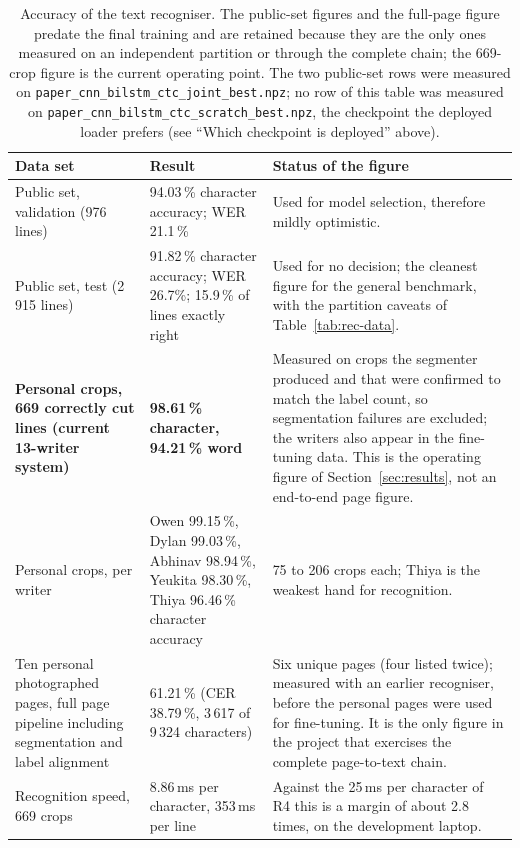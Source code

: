 \begin{table}[h]
\centering
\fontsize{9.5}{11.5}\selectfont
\begin{tabularx}{\linewidth}{|p{3.7cm}|p{2.7cm}|X|}
\hline
\textbf{Data set} & \textbf{Result} & \textbf{Status of the figure} \\
\hline
Public set, validation (976 lines) & 94.03\,\% character accuracy; WER 21.1\,\% & Used for model selection, therefore mildly optimistic. \\
\hline
Public set, test (2\,915 lines) & 91.82\,\% character accuracy; WER 26.7\%; 15.9\,\% of lines exactly right & Used for no decision; the cleanest figure for the general benchmark, with the partition caveats of Table~\ref{tab:rec-data}. \\
\hline
\textbf{Personal crops, 669 correctly cut lines (current 13-writer system)} & \textbf{98.61\,\% character, 94.21\,\% word} & Measured on crops the segmenter produced and that were confirmed to match the label count, so segmentation failures are excluded; the writers also appear in the fine-tuning data. This is the operating figure of Section~\ref{sec:results}, not an end-to-end page figure. \\
\hline
Personal crops, per writer & Owen 99.15\,\%, Dylan 99.03\,\%, Abhinav 98.94\,\%, Yeukita 98.30\,\%, Thiya 96.46\,\% character accuracy & 75 to 206 crops each; Thiya is the weakest hand for recognition. \\
\hline
Ten personal photographed pages, full page pipeline including segmentation and label alignment & 61.21\,\% (CER 38.79\,\%, 3\,617 of 9\,324 characters) & Six unique pages (four listed twice); measured with an earlier recogniser, before the personal pages were used for fine-tuning. It is the only figure in the project that exercises the complete page-to-text chain. \\
\hline
Recognition speed, 669 crops & 8.86\,ms per character, 353\,ms per line & Against the 25\,ms per character of R4 this is a margin of about 2.8 times, on the development laptop. \\
\hline
\end{tabularx}
\caption{Accuracy of the text recogniser. The public-set figures and the full-page figure predate the final training and are retained because they are the only ones measured on an independent partition or through the complete chain; the 669-crop figure is the current operating point. The two public-set rows were measured on \texttt{paper\_cnn\_bilstm\_ctc\_joint\_best.npz}; no row of this table was measured on \texttt{paper\_cnn\_bilstm\_ctc\_scratch\_best.npz}, the checkpoint the deployed loader prefers (see ``Which checkpoint is deployed'' above).}
\label{tab:rec-results}
\end{table}

